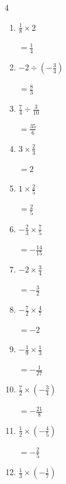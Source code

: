 \begin{multicols}{4}
\begin{enumerate}
        $\displaystyle =-\frac{25}{12}$

  \item $\displaystyle \frac{1}{8}\times{}2$

        $\displaystyle =\frac{1}{4}$

  \item $\displaystyle -2\div{}\left(-\frac{3}{4}\right)$

        $\displaystyle =\frac{8}{3}$

  \item $\displaystyle \frac{7}{4}\div{}\frac{3}{10}$

        $\displaystyle =\frac{35}{6}$

  \item $\displaystyle 3\times{}\frac{2}{3}$

        $\displaystyle =2$

  \item $\displaystyle 1\times{}\frac{2}{5}$

        $\displaystyle =\frac{2}{5}$

\columnbreak %

  \item $\displaystyle -\frac{2}{3}\times{}\frac{7}{5}$

        $\displaystyle =-\frac{14}{15}$

  \item $\displaystyle -2\times{}\frac{3}{4}$

        $\displaystyle =-\frac{3}{2}$

  \item $\displaystyle -\frac{7}{2}\times{}\frac{4}{7}$

        $\displaystyle =-2$

  \item $\displaystyle -\frac{1}{9}\times{}\frac{1}{3}$

        $\displaystyle =-\frac{1}{27}$

  \item $\displaystyle \frac{7}{2}\times{}\left(-\frac{3}{4}\right)$

        $\displaystyle =-\frac{21}{8}$

  \item $\displaystyle \frac{1}{2}\times{}\left(-\frac{4}{5}\right)$

        $\displaystyle =-\frac{2}{5}$

  \item $\displaystyle \frac{1}{3}\times{}\left(-\frac{1}{7}\right)$


\end{enumerate}
\end{multicols}
